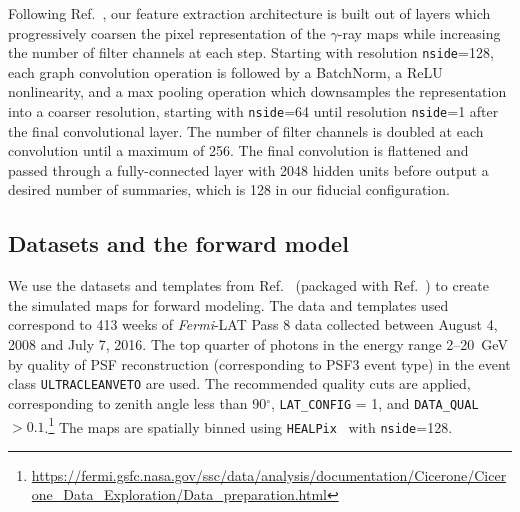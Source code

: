 \documentclass[prd,aps,10pt,nofootinbib,twocolumn,superscriptaddress,preprintnumbers,balancelastpage,longbibliography]{revtex4-1}
\begin{document}
Following Ref.~\cite{Perraudin:2018rbt}, our feature extraction architecture is built out of layers which progressively coarsen the pixel representation of the $\gamma$-ray maps while increasing the number of filter channels at each step. Starting with \HEALPix resolution \texttt{nside}=128, each graph convolution operation is followed by a BatchNorm, a ReLU nonlinearity, and a max pooling operation which downsamples the representation into a coarser resolution, starting with \texttt{nside}=64 until resolution \texttt{nside}=1 after the final convolutional layer. The number of filter channels is doubled at each convolution until a maximum of 256. The final convolution is flattened and passed through a fully-connected layer with 2048 hidden units before output a desired number of summaries, which is 128 in our fiducial configuration.

\subsection{Datasets and the forward model}
\label{sec:datasets}

We use the datasets and templates from Ref.~\cite{rodd_nicholas_safdi_siddharth_2016} (packaged with Ref.~\cite{Mishra-Sharma:2016gis}) to create the simulated maps for forward modeling. The data and templates used correspond to 413 weeks of \emph{Fermi}-LAT Pass 8 data collected between August 4, 2008 and July 7, 2016. The top quarter of photons in the energy range 2--20~GeV by quality of PSF reconstruction (corresponding to PSF3 event type) in the event class \texttt{ULTRACLEANVETO} are used. The recommended quality cuts are applied, corresponding to zenith angle less than 90$^\circ$, \texttt{LAT\_CONFIG} = 1, and \texttt{DATA\_QUAL} $> 0.1$.\footnote{\url{https://fermi.gsfc.nasa.gov/ssc/data/analysis/documentation/Cicerone/Cicerone_Data_Exploration/Data_preparation.html}} The maps are spatially binned using \texttt{HEALPix}~\cite{Gorski:2004by} with \texttt{nside}=128.
\end{document}

